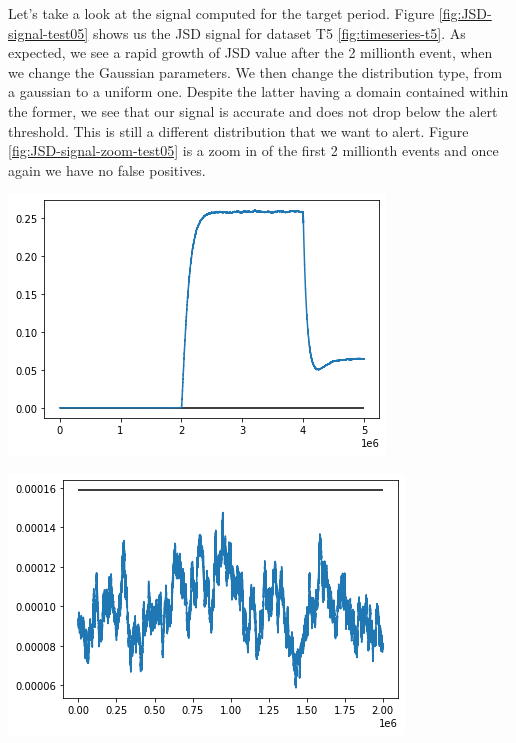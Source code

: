 Let's take a look at the signal computed for the target period. Figure \ref{fig:JSD-signal-test05} shows us the JSD signal for dataset T5 \ref{fig:timeseries-t5}. As expected, we see a rapid growth of JSD value after the 2 millionth event, when we change the Gaussian parameters. We then change the distribution type, from a gaussian to a uniform one. Despite the latter having a domain contained within the former, we see that our signal is accurate and does not drop below the alert threshold. This is still a different distribution that we want to alert. Figure \ref{fig:JSD-signal-zoom-test05} is a zoom in of the first 2 millionth events and once again we have no false positives.
\begin{center}
\begin{minipage}{.5\textwidth}
  \centering
  \includegraphics[width=1\linewidth]{figures/stream-analysis-viz-test05.png}
  \label{fig:JSD-signal-test05}
\end{minipage}%
\begin{minipage}{.5\textwidth}
  \centering
  \includegraphics[width=1\linewidth]{figures/stream-analysis-viz-zoom-test05.png}
  \label{fig:JSD-signal-zoom-test05}
\end{minipage}
\end{center}


